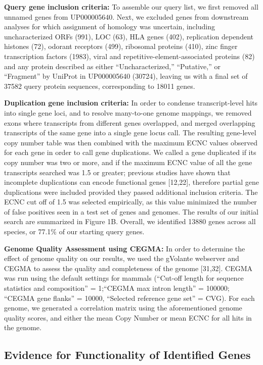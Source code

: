 \documentclass[]{elsarticle} %
\begin{document}
\textbf{Query gene inclusion criteria:} To assemble our query list, we
first removed all unnamed genes from UP000005640. Next, we excluded
genes from downstream analyses for which assignment of homology was
uncertain, including uncharacterized ORFs (991), LOC (63), HLA genes
(402), replication dependent histones (72), odorant receptors (499),
ribosomal proteins (410), zinc finger transcription factors (1983),
viral and repetitive-element-associated proteins (82) and any protein
described as either ``Uncharacterized,'' ``Putative,'' or ``Fragment''
by UniProt in UP000005640 (30724), leaving us with a final set of 37582
query protein sequences, corresponding to 18011 genes.

\textbf{Duplication gene inclusion criteria:} In order to condense
transcript-level hits into single gene loci, and to resolve many-to-one
genome mappings, we removed exons where transcripts from different genes
overlapped, and merged overlapping transcripts of the same gene into a
single gene locus call. The resulting gene-level copy number table was
then combined with the maximum ECNC values observed for each gene in
order to call gene duplications. We called a gene duplicated if its copy
number was two or more, and if the maximum ECNC value of all the gene
transcripts searched was 1.5 or greater; previous studies have shown
that incomplete duplications can encode functional genes {[}12,22{]},
therefore partial gene duplications were included provided they passed
additional inclusion criteria. The ECNC cut off of 1.5 was selected
empirically, as this value minimized the number of false positives seen
in a test set of genes and genomes. The results of our initial search
are summarized in Figure 1B. Overall, we identified 13880 genes across
all species, or 77.1\% of our starting query genes.

\textbf{Genome Quality Assessment using CEGMA:} In order to determine
the effect of genome quality on our results, we used the gVolante
webserver and CEGMA to assess the quality and completeness of the genome
{[}31,32{]}. CEGMA was run using the default settings for mammals
(``Cut-off length for sequence statistics and composition'' = 1;``CEGMA
max intron length'' = 100000; ``CEGMA gene flanks'' = 10000, ``Selected
reference gene set'' = CVG). For each genome, we generated a correlation
matrix using the aforementioned genome quality scores, and either the
mean Copy Number or mean ECNC for all hits in the genome.

\hypertarget{evidence-for-functionality-of-identified-genes}{%
\subsection{Evidence for Functionality of Identified
Genes}\label{evidence-for-functionality-of-identified-genes}}
\end{document}
